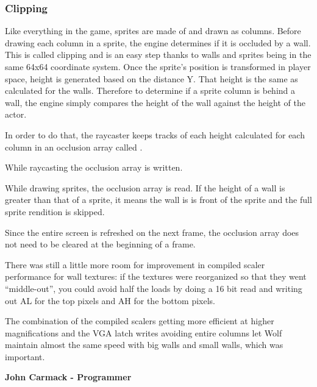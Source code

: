 \subsubsection{Clipping}
Like everything in the game, sprites are made of and drawn as columns. Before drawing each column in a sprite, the engine determines if it is occluded by a wall. This is called clipping and is an easy step thanks to walls and sprites being in the same 64x64 coordinate system. Once the sprite's position is transformed in player space, height is generated based on the distance Y. That height is the same as calculated for the walls. Therefore to determine if a sprite column is behind a wall, the engine simply compares the height of the wall against the height of the actor.\\
\par
In order to do that, the raycaster keeps tracks of each height calculated for each column in an occlusion array called .\\
\par
\begin{minipage}{\textwidth}

\end{minipage}
\par
While raycasting the occlusion array is written.\\
\par
\begin{minipage}{\textwidth}

\end{minipage}
While drawing sprites, the occlusion array is read. If the height of a wall is greater than that of a sprite, it means the wall is is front of the sprite and the full sprite rendition is skipped.\\
\par
\begin{minipage}{\textwidth}

\end{minipage}
\par
Since the entire screen is refreshed on the next frame, the occlusion array does not need to be cleared at the beginning of a frame.\\


\begin{fancyquotes}
There was still a little more room for improvement in compiled scaler performance for wall textures:  if the textures were reorganized so that they went “middle-out”, you could avoid half the loads by doing a 16 bit read and writing out AL for the top pixels and AH for the bottom pixels.\\
\par 
The combination of the compiled scalers getting more efficient at higher magnifications and the VGA latch writes avoiding entire columns let Wolf maintain almost the same speed with big walls and small walls, which was important.\\
\par
\textbf{John Carmack - Programmer}
 \end{fancyquotes}


